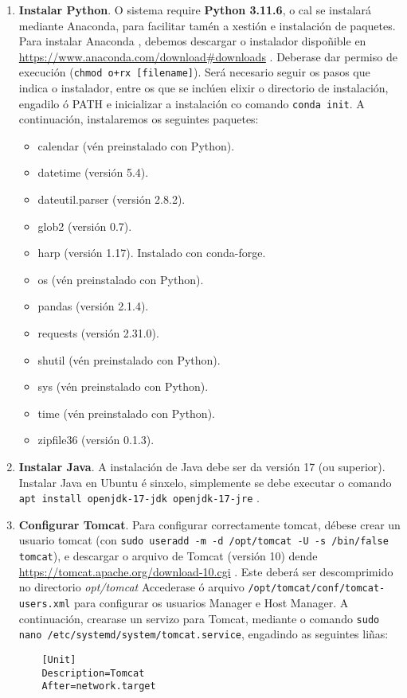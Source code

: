 \begin{enumerate}
    \item \textbf{Instalar Python}. O sistema require \textbf{Python 3.11.6}, o cal se instalará mediante Anaconda, para facilitar tamén a xestión e instalación de paquetes. Para instalar Anaconda
    , debemos descargar o instalador dispoñible en \url{https://www.anaconda.com/download#downloads} . Deberase dar permiso de execución (\texttt{chmod o+rx [filename]}). Será necesario seguir os
    pasos que indica o instalador, entre os que se inclúen elixir o directorio de instalación, engadilo ó PATH e inicializar a instalación co comando \texttt{conda init}. A continuación, 
    instalaremos os seguintes paquetes:
    \begin{itemize}
        \item calendar (vén preinstalado con Python).
        \item datetime (versión 5.4).
        \item dateutil.parser (versión 2.8.2).
        \item glob2 (versión 0.7).
        \item harp (versión 1.17). Instalado con conda-forge.
        \item os (vén preinstalado con Python).
        \item pandas (versión 2.1.4).
        \item requests (versión 2.31.0).
        \item shutil (vén preinstalado con Python).
        \item sys (vén preinstalado con Python).
        \item time (vén preinstalado con Python).
        \item zipfile36 (versión 0.1.3).
    \end{itemize}
    \item \textbf{Instalar Java}. A instalación de Java debe ser da versión 17 (ou superior). Instalar Java en Ubuntu é sinxelo, simplemente se debe executar o comando \texttt{apt install openjdk-17-jdk
    openjdk-17-jre} .
    \item \textbf{Configurar Tomcat}. Para configurar correctamente tomcat, débese crear un usuario tomcat (con \texttt{sudo useradd -m -d /opt/tomcat -U -s /bin/false tomcat}), e descargar o
    arquivo de Tomcat (versión 10) dende \url{https://tomcat.apache.org/download-10.cgi} . Este deberá ser descomprimido no directorio \textit{opt/tomcat} Accederase ó arquivo \texttt{/opt/tomcat/conf/tomcat-users.xml}
    para configurar os usuarios Manager e Host Manager. A continuación, crearase un servizo para Tomcat, mediante o comando \texttt{sudo nano \break/etc/systemd/system/tomcat.service}, engadindo as
    seguintes liñas:
    \begin{lstlisting}
    [Unit]
    Description=Tomcat
    After=network.target


\end{lstlisting}
\end{enumerate}
